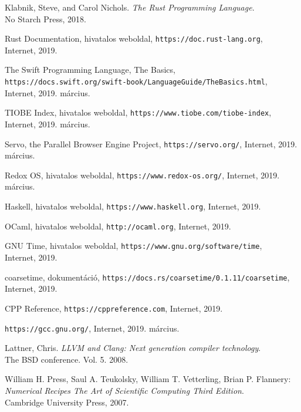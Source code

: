 
\begin{thebibliography}{x}

Klabnik, Steve, and Carol Nichols. \emph{The Rust Programming Language}. \\
No Starch Press, 2018.

Rust Documentation, hivatalos weboldal, \texttt{https://doc.rust-lang.org}, \\
Internet, 2019.

The Swift Programming Language, The Basics, \\
\texttt{https://docs.swift.org/swift-book/LanguageGuide/TheBasics.html}, \\
Internet, 2019. március.

TIOBE Index, hivatalos weboldal, \texttt{https://www.tiobe.com/tiobe-index}, \\
Internet, 2019. március.

Servo, the Parallel Browser Engine Project, \texttt{https://servo.org/}, Internet, 2019. március.

Redox OS, hivatalos weboldal, \texttt{https://www.redox-os.org/}, Internet, 2019. március.

Haskell, hivatalos weboldal, \texttt{https://www.haskell.org}, Internet, 2019.

OCaml, hivatalos weboldal, \texttt{http://ocaml.org}, Internet, 2019.

GNU Time, hivatalos weboldal, \texttt{https://www.gnu.org/software/time}, \\
Internet, 2019.

coarsetime, dokumentáció, \texttt{https://docs.rs/coarsetime/0.1.11/coarsetime}, Internet, 2019.

CPP Reference, \texttt{https://cppreference.com}, Internet, 2019.

\texttt{https://gcc.gnu.org/}, Internet, 2019. március.

Lattner, Chris. \emph{LLVM and Clang: Next generation compiler technology}. \\
The BSD conference. Vol. 5. 2008.

William H. Press, Saul A. Teukolsky, William T. Vetterling, Brian P. Flannery: \emph{Numerical Recipes The Art of Scientific Computing Third Edition}. \\
Cambridge University Press, 2007.


\end{thebibliography}
